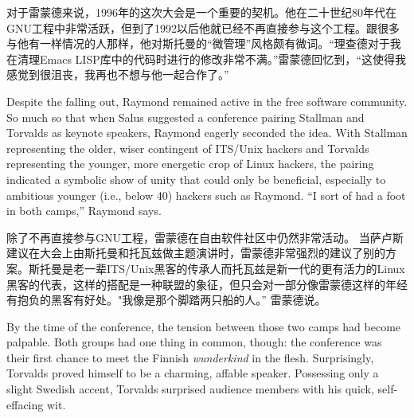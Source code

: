 \ifdefined\chs
对于雷蒙德来说，1996年的这次大会是一个重要的契机。他在二十世纪80年代在GNU工程中非常活跃，但到了1992以后他就已经不再直接参与这个工程。跟很多与他有一样情况的人那样，他对斯托曼的“微管理”风格颇有微词。“理查德对于我在清理Emacs LISP库中的代码时进行的修改非常不满。”雷蒙德回忆到，“这使得我感觉到很沮丧，我再也不想与他一起合作了。”
\fi

\ifdefined\eng
Despite the falling out, Raymond remained active in the free software community. So much so that when Salus suggested a conference pairing Stallman and Torvalds as keynote speakers, Raymond eagerly seconded the idea. With Stallman representing the older, wiser contingent of ITS/Unix hackers and Torvalds representing the younger, more energetic crop of Linux hackers, the pairing indicated a symbolic show of unity that could only be beneficial, especially to ambitious younger (i.e., below 40) hackers such as Raymond. ``I sort of had a foot in both camps,'' Raymond says.
\fi

\ifdefined\chs
除了不再直接参与GNU工程，雷蒙德在自由软件社区中仍然非常活动。 当萨卢斯建议在大会上由斯托曼和托瓦兹做主题演讲时，雷蒙德非常强烈的建议了别的方案。斯托曼是老一辈ITS/Unix黑客的传承人而托瓦兹是新一代的更有活力的Linux黑客的代表，这样的搭配是一种联盟的象征，但只会对一部分像雷蒙德这样的年经有抱负的黑客有好处。"我像是那个脚踏两只船的人。” 雷蒙德说。
\fi

\ifdefined\eng
By the time of the conference, the tension between those two camps had become palpable. Both groups had one thing in common, though: the conference was their first chance to meet the Finnish \textit{wunderkind} in the flesh. Surprisingly, Torvalds proved himself to be a charming, affable speaker. Possessing only a slight Swedish accent, Torvalds surprised audience members with his quick, self-effacing wit.
\fi

